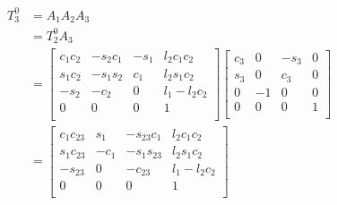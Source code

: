 \documentclass[fleqn,english,11pt,a4paper,landscape]{article}
\begin{document}
		\begin{align*}
			T^0_3 &= A_1A_2A_3 \\
				  &= T^0_2A_3 \\
				  &= \begin{bmatrix}
			c_1c_2&-s_2c_1&-s_1&l_2c_1c_2 \\
			s_1c_2&-s_1s_2&c_1&l_2s_1c_2 \\
			-s_2&-c_2&0&l_1-l_2c_2 \\
			0&0&0&1 \\
		\end{bmatrix}\begin{bmatrix}
		 c_{3} & 0 & -s_{3} & 0\\
		 s_{3} & 0 & c_{3} & 0\\
		 0 & -1 & 0 & 0\\
		 0 & 0 & 0 & 1\\
		\end{bmatrix}\\
		&=\begin{bmatrix}
		c_1c_{23}&s_1&-s_{23}c_1&l_2c_1c_2\\
		s_1c_{23}&-c_1&-s_1s_{23}&l_2s_1c_2\\
		-s_{23}&0&-c_{23}&l_1-l_2c_2\\
		0&0&0&1\\
		\end{bmatrix}\\
		\end{align*}
\end{document}
